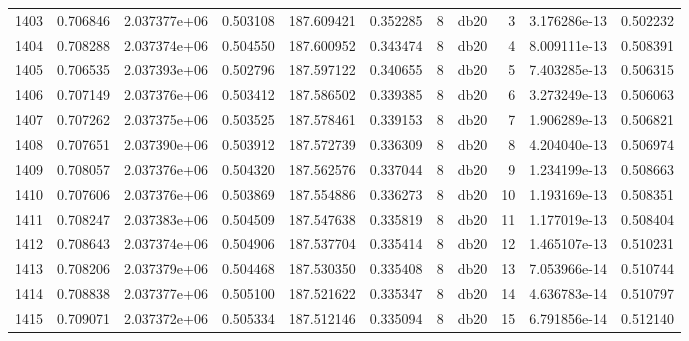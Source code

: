 \begin{tabular}{lrrrrrrlrrr}
1403 &    0.706846 &        2.037377e+06 &  0.503108 &              187.609421 &    0.352285 &       8 &         db20 &      3 &   3.176286e-13 &      0.502232 \\
1404 &    0.708288 &        2.037374e+06 &  0.504550 &              187.600952 &    0.343474 &       8 &         db20 &      4 &   8.009111e-13 &      0.508391 \\
1405 &    0.706535 &        2.037393e+06 &  0.502796 &              187.597122 &    0.340655 &       8 &         db20 &      5 &   7.403285e-13 &      0.506315 \\
1406 &    0.707149 &        2.037376e+06 &  0.503412 &              187.586502 &    0.339385 &       8 &         db20 &      6 &   3.273249e-13 &      0.506063 \\
1407 &    0.707262 &        2.037375e+06 &  0.503525 &              187.578461 &    0.339153 &       8 &         db20 &      7 &   1.906289e-13 &      0.506821 \\
1408 &    0.707651 &        2.037390e+06 &  0.503912 &              187.572739 &    0.336309 &       8 &         db20 &      8 &   4.204040e-13 &      0.506974 \\
1409 &    0.708057 &        2.037376e+06 &  0.504320 &              187.562576 &    0.337044 &       8 &         db20 &      9 &   1.234199e-13 &      0.508663 \\
1410 &    0.707606 &        2.037376e+06 &  0.503869 &              187.554886 &    0.336273 &       8 &         db20 &     10 &   1.193169e-13 &      0.508351 \\
1411 &    0.708247 &        2.037383e+06 &  0.504509 &              187.547638 &    0.335819 &       8 &         db20 &     11 &   1.177019e-13 &      0.508404 \\
1412 &    0.708643 &        2.037374e+06 &  0.504906 &              187.537704 &    0.335414 &       8 &         db20 &     12 &   1.465107e-13 &      0.510231 \\
1413 &    0.708206 &        2.037379e+06 &  0.504468 &              187.530350 &    0.335408 &       8 &         db20 &     13 &   7.053966e-14 &      0.510744 \\
1414 &    0.708838 &        2.037377e+06 &  0.505100 &              187.521622 &    0.335347 &       8 &         db20 &     14 &   4.636783e-14 &      0.510797 \\
1415 &    0.709071 &        2.037372e+06 &  0.505334 &              187.512146 &    0.335094 &       8 &         db20 &     15 &   6.791856e-14 &      0.512140 \\

\end{tabular}
